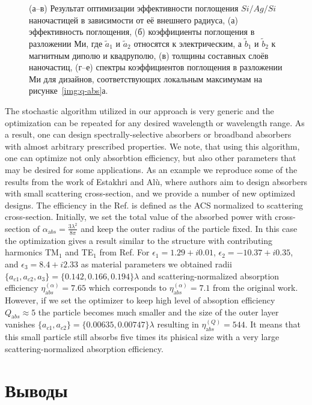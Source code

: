 \begin{figure}[t]
  \caption{ (а--в) Результат оптимизации эффективности поглощения
    $Si/Ag/Si$ наночастицей в зависимости от её внешнего радиуса, (а)
    эффективность поглощения, (б) коэффициенты поглощения в разложении
    Ми, где $\tilde{a}_1$ и $\tilde{a}_2$ относятся к электрическим, а
    $\tilde{b}_1$ и $\tilde{b}_2$ к магнитным диполю и квадруполю, (в)
    толщины составных слоёв наночастиц, (г--е) спектры коэффициентов
    поглощения в разложении Ми для дизайнов, соответствующих локальным
    максимумам на рисунке~\ref{img:q-abs}а.}
  \label{img:absorb-field}  

\end{figure}


The stochastic algorithm utilized in our approach is very generic and
the optimization can be repeated for any desired wavelength or
wavelength range.  As a result, one can design spectrally-selective
absorbers or broadband absorbers with almost arbitrary prescribed
properties. We note, that using this algorithm, one can optimize not
only absorbtion efficiency, but also other parameters that may be
desired for some applications. As an example we reproduce some of the
results from the work of Estakhri and Al\`u,\cite{Alu-2014} where
authors aim to design absorbers with small scattering cross-section,
and we provide a number of new optimized designs. The efficiency in
the Ref.\cite{Alu-2014} is defined as the ACS normalized to
scattering cross-section. Initially, we set the total value of the
absorbed power with cross-section of $\alpha_{\mathrm
  abs}=\frac{3\lambda^2}{8\pi}$ and keep the outer radius of the
particle fixed. In this case the optimization gives a result similar
to the structure with contributing harmonics TM${_1}$ and TE$_1$ from
Ref.\cite{Alu-2014}  For $\epsilon_1 = 1.29+i0.01$, $\epsilon_2 =
-10.37+ i0.35$, and $\epsilon_3=8.4+i2.33$ as material parameters we
obtained radii $\{a_{c1},a_{c2},a_3\}=\{0.142,0.166,0.194\}\lambda$
and scattering-normalized absorption efficiency $\eta_{\mathrm
  abs}^{(\alpha)} =7.65$ which corresponds to $\eta_{\mathrm
  abs}^{(\alpha)} =7.1$ from the original work.\cite{Alu-2014}
However, if we set the optimizer to keep high level of absoption
efficiency $Q_{\mathrm abs} \approx 5$ the particle becomes much smaller
and the size of the outer layer vanishes
$\{a_{c1},a_{c2}\}=\{0.00635,0.00747\}\lambda$ resulting in $\eta_{\mathrm
  abs}^{(Q)} =544$.  It means that this small particle still absorbs
five times its phisical size with a very large scattering-normalized
absorption efficiency.


\section{Выводы}



\clearpage